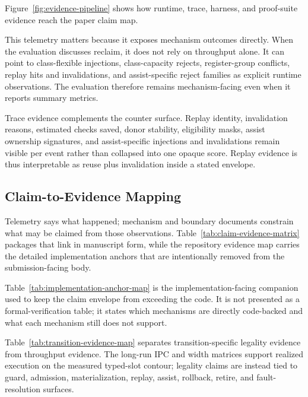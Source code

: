 \documentclass[twocolumn]{article}
\begin{document}
Figure~\ref{fig:evidence-pipeline} shows how runtime, trace, harness, and proof-suite evidence reach the paper claim map.



This telemetry matters because it exposes mechanism outcomes directly. When the evaluation discusses reclaim, it does not rely on throughput alone. It can point to class-flexible injections, class-capacity rejects, register-group conflicts, replay hits and invalidations, and assist-specific reject families as explicit runtime observations. The evaluation therefore remains mechanism-facing even when it reports summary metrics.

Trace evidence complements the counter surface. Replay identity, invalidation reasons, estimated checks saved, donor stability, eligibility masks, assist ownership signatures, and assist-specific injections and invalidations remain visible per event rather than collapsed into one opaque score. Replay evidence is thus interpretable as reuse plus invalidation inside a stated envelope.


\subsection{Claim-to-Evidence Mapping}

Telemetry says what happened; mechanism and boundary documents constrain what may be claimed from those observations. Table~\ref{tab:claim-evidence-matrix} packages that link in manuscript form, while the repository evidence map carries the detailed implementation anchors that are intentionally removed from the submission-facing body.



Table~\ref{tab:implementation-anchor-map} is the implementation-facing companion used to keep the claim envelope from exceeding the code. It is not presented as a formal-verification table; it states which mechanisms are directly code-backed and what each mechanism still does not support.



Table~\ref{tab:transition-evidence-map} separates transition-specific legality evidence from throughput evidence. The long-run IPC and width matrices support realized execution on the measured typed-slot contour; legality claims are instead tied to guard, admission, materialization, replay, assist, rollback, retire, and fault-resolution surfaces.
\end{document}
